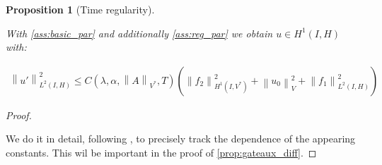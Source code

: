 \documentclass[english,a4paper,9pt,oneside]{scrbook}	%
\theoremstyle{break}
\newtheorem{prop}[equation]{Proposition}
\newenvironment{mproof}[1][\proofname]{%
  \begin{proof}[#1]$ $\par\nobreak\ignorespaces
}{%
  \end{proof}
}
\renewcommand*{\proofname}{Proof}
\theoremstyle{remark}
\newcommand{\ds}{\displaystyle}
\newcommand{\norm}[1]{\left\lVert#1\right\rVert}
\newcommand{\HN}[1]{\norm{#1}_{H}}
\newcommand{\VN}[1]{\norm{#1}_{V}}
\newcommand{\VSN}[1]{\norm{#1}_{V^*}}
\begin{document}
\begin{appendices}
\begin{prop}[Time regularity]
\label{thm:const_track}

With \cref{ass:basic_par} and  additionally \cref{ass:reg_par} we obtain $u \in H^1(I,H)$ with:

\begin{align*}
\norm{u'}^2_{L^2(I,H)}\leq  C(\lambda, \alpha, \VSN{A}, T)(\norm{f_2}_{H^1(I,V^*)}^2+\VN{u_{0}}^2+\norm{f_1}_{L^2(I,H)}^2)
\end{align*}

%

\end{prop}
\begin{mproof}

We do it in detail, following \cite{gilardi}, to precisely track the dependence of the appearing constants. This wil be important in the proof of \cref{prop:gateaux_diff}.

%
%
%
%


\end{mproof}
\end{appendices}
\end{document}
